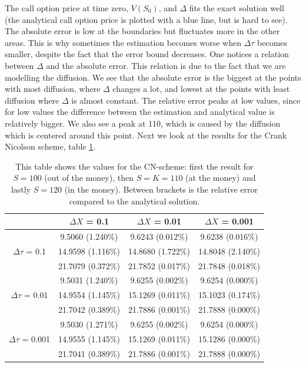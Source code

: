 \documentclass[11pt,a4paper]{article}
\begin{document}
The call option price at time zero, $V(S_0)$, and $\Delta$ fits the exact solution well (the analytical call option price is plotted with a blue line, but is hard to see). The absolute error is low at the boundaries but fluctuates more in the other areas. This is why sometimes the estimation becomes worse when $\Delta \tau$ becomes smaller, despite the fact that the error bound decreases. One notices a relation between $\Delta$ and the absolute error. This relation is due to the fact that we are modelling the diffusion. We see that the absolute error is the biggest at the points with most diffusion, where $\Delta$ changes a lot, and lowest at the points with least diffusion where $\Delta$ is almost constant. The relative error peaks at low values, since for low values the difference between the estimation and analytical value is relatively bigger. We also see a peak at 110, which is caused by the diffusion which is centered around this point. Next we look at the results for the Crank Nicolson scheme, table \ref{tab:CNS}.

\begin{table}[h]
\centering
\begin{tabular}{c|c|c|c}
  & $\Delta X$ = 0.1 & $\Delta X$ = 0.01 &$\Delta X$ = 0.001\\
  \hline
  &	9.5060	(1.240\%)	&	9.6243	(0.012\%)	&	9.6238	(0.016\%)	\\
  $\Delta \tau$ = 0.1 	&	14.9598	(1.116\%)	& 14.8680	(1.722\%)	& 14.8048	(2.140\%)	\\
  &	21.7079	(0.372\%)	&	21.7852	(0.017\%)	&	21.7848	(0.018\%)	\\
  \hline
  &	9.5031	(1.240\%)	&	9.6255	(0.002\%)	&	9.6254	(0.000\%)	\\
  $\Delta \tau$ = 0.01	&	14.9554	(1.145\%)	&	15.1269	(0.011\%)	&	15.1023	(0.174\%)	\\
  &	21.7042	(0.389\%)	&	21.7886	(0.001\%)	&	21.7888	(0.000\%)	\\
  \hline
  &	9.5030	(1.271\%)	&	9.6255	(0.002\%)	&	9.6254	(0.000\%)	\\
  $\Delta \tau$ = 0.001	&	14.9555	(1.145\%)	&	15.1269	(0.011\%)	&	15.1286	(0.000\%)	\\	
  &	21.7041	(0.389\%)	&	21.7886	(0.001\%)	&	21.7888	(0.000\%)
\end{tabular}
\caption{This table shows the values for the CN-scheme: first the result for $S=100$ (out of the money), then $S=K=110$ (at the money) and lastly $S=120$ (in the money). Between brackets is the relative error compared to the analytical solution.}
\label{tab:CNS}
\end{table}
\end{document}
